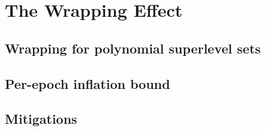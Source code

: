 
\section{The Wrapping Effect}
\label{p2:apx:wrapping}

\subsection{Wrapping for polynomial superlevel sets}
\label{p2:sub:apx_wrapping_polynomial}

\subsection{Per-epoch inflation bound}
\label{p2:sub:apx_inflation_bound}

\subsection{Mitigations}
\label{p2:sub:apx_wrapping_mitigations}
